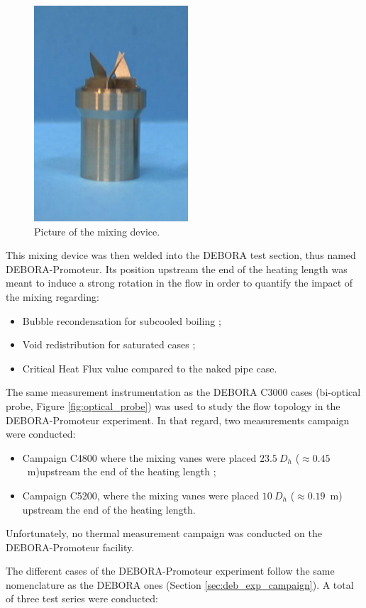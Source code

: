 \begin{figure}[!h]
\centering
\includegraphics[width=0.2\linewidth]{img/DEBORA-Promoteur/prom_pic.png}
\caption{Picture of the mixing device.}
\label{fig:debprom_vanes}
\end{figure}

\npar

This mixing device was then welded into the DEBORA test section, thus named DEBORA-Promoteur. Its position upstream the end of the heating length was meant to induce a strong rotation in the flow in order to quantify the impact of the mixing regarding:

\begin{itemize}
\item Bubble recondensation for subcooled boiling ;
\item Void redistribution for saturated cases ;
\item Critical Heat Flux value compared to the naked pipe case.
\end{itemize}


The same measurement instrumentation as the DEBORA C3000 cases   (bi-optical probe, Figure \ref{fig:optical_probe}) was used to study the flow topology in the DEBORA-Promoteur experiment. In that regard, two measurements campaign were conducted:

\begin{itemize}
\item Campaign C4800 where the mixing vanes were placed $23.5\ D_{h}$ ($\approx 0.45$\ m)upstream the end of the heating length ;
\item Campaign C5200, where the mixing vanes were placed $10\ D_{h}$ ($\approx 0.19$\ m) upstream the end of the heating length.
\end{itemize}

\begin{note*}{}
Unfortunately, no thermal measurement campaign was conducted on the DEBORA-Promoteur facility.
\end{note*}

The different cases of the DEBORA-Promoteur experiment follow the same nomenclature as the DEBORA ones (Section \ref{sec:deb_exp_campaign}). A total of three test series were conducted:

